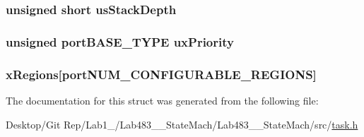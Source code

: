 \hypertarget{structx_t_a_s_k___p_a_r_a_m_t_e_r_s_a79bae2c7efe48bf5b050e0b0d9eeed82}{
\subsubsection[{us\-Stack\-Depth}]{\setlength{\rightskip}{0pt plus 5cm}unsigned short us\-Stack\-Depth}}\label{structx_t_a_s_k___p_a_r_a_m_t_e_r_s_a79bae2c7efe48bf5b050e0b0d9eeed82}
\hypertarget{structx_t_a_s_k___p_a_r_a_m_t_e_r_s_af9efa11aaf2bd2b1e7b0da3991a493c8}{
\subsubsection[{ux\-Priority}]{\setlength{\rightskip}{0pt plus 5cm}unsigned {\bf port\-B\-A\-S\-E\-\_\-\-T\-Y\-P\-E} ux\-Priority}}\label{structx_t_a_s_k___p_a_r_a_m_t_e_r_s_af9efa11aaf2bd2b1e7b0da3991a493c8}
\hypertarget{structx_t_a_s_k___p_a_r_a_m_t_e_r_s_a3d1c92865cea10ff47b3bb47d21fc2fc}{
\subsubsection[{x\-Regions}]{ x\-Regions\mbox{[}{\bf port\-N\-U\-M\-\_\-\-C\-O\-N\-F\-I\-G\-U\-R\-A\-B\-L\-E\-\_\-\-R\-E\-G\-I\-O\-N\-S}\mbox{]}}}\label{structx_t_a_s_k___p_a_r_a_m_t_e_r_s_a3d1c92865cea10ff47b3bb47d21fc2fc}


The documentation for this struct was generated from the following file\-:\begin{DoxyCompactItemize}
\item 
Desktop/\-Git Rep/\-Lab1\-\_/\-Lab483\-\_\-\_\-\-State\-Mach/\-Lab483\-\_\-\_\-\-State\-Mach/src/\hyperlink{task_8h}{task.\-h}\end{DoxyCompactItemize}
